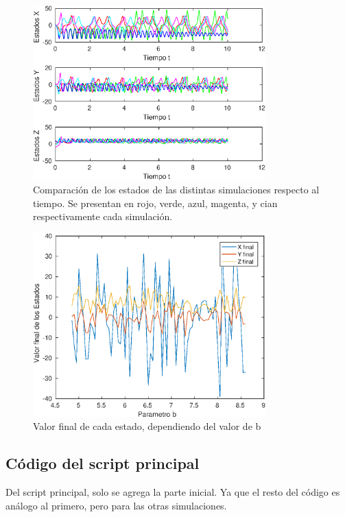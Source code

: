 \documentclass[12pt,letterpaper]{article}
\begin{document}

\begin{figure}
	\centering
	\includegraphics[width=0.8\textwidth]{pictures/comparacion}
	\caption{Comparación de los estados de las distintas simulaciones respecto al tiempo. Se presentan en rojo, verde, azul, magenta, y cian respectivamente cada simulación.}
	\label{fig:comparacion}
\end{figure}

\begin{figure}
	\centering
	\includegraphics[width=0.8\textwidth]{pictures/sensibilidad}
	\caption{Valor final de cada estado, dependiendo del valor de b}
	\label{fig:sensibilidad}
\end{figure}

\subsection{Código del script principal}
Del script principal, solo se agrega la parte inicial. Ya que el resto del código es análogo al primero, pero para las otras simulaciones.

\end{document}

